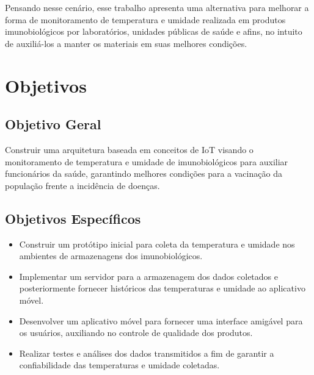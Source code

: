 Pensando nesse cenário, esse trabalho apresenta uma alternativa para melhorar a forma de monitoramento de temperatura e umidade realizada em produtos imunobiológicos por laboratórios, unidades públicas de saúde e afins, no intuito de auxiliá-los a manter os materiais em suas melhores condições.

\section{Objetivos}
\label{intro:objetivos}

\subsection{Objetivo Geral}
\label{intro:objetivos:geral}
Construir uma arquitetura baseada em conceitos de IoT visando o monitoramento de temperatura e umidade de imunobiológicos para auxiliar funcionários da saúde, garantindo melhores condições para a vacinação da população frente a incidência de doenças.

\subsection{Objetivos Específicos}
\label{intro:objetivos:especificos}
\begin{itemize}
  \item Construir um protótipo inicial para coleta da temperatura e umidade nos ambientes de armazenagens dos imunobiológicos.
  \item Implementar um servidor para a armazenagem dos dados coletados e posteriormente fornecer históricos das temperaturas e umidade ao aplicativo móvel.
  \item Desenvolver um aplicativo móvel para fornecer uma interface amigável para os usuários, auxiliando no controle de qualidade dos produtos.
  \item Realizar testes e análises dos dados transmitidos a fim de garantir a confiabilidade das temperaturas e umidade coletadas.
\end{itemize}






